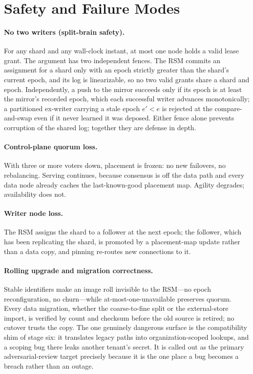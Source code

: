 \documentclass[11pt]{article}
\begin{document}
\section{Safety and Failure Modes}
\label{sec:failure}

\paragraph{No two writers (split-brain safety).}
For any shard and any wall-clock instant, at most one node holds a valid lease
grant. The argument has two independent fences. The RSM commits an assignment
for a shard only with an epoch strictly greater than the shard's current
epoch, and its log is linearizable, so no two valid grants share a shard and
epoch. Independently, a push to the mirror succeeds only if its epoch is at
least the mirror's recorded epoch, which each successful writer advances
monotonically; a partitioned ex-writer carrying a stale epoch $e' < e$ is
rejected at the compare-and-swap even if it never learned it was deposed.
Either fence alone prevents corruption of the shared log; together they are
defense in depth.

\paragraph{Control-plane quorum loss.}
With three or more voters down, placement is frozen: no new failovers, no
rebalancing. Serving continues, because consensus is off the data path and
every data node already caches the last-known-good placement map. Agility
degrades; availability does not.

\paragraph{Writer node loss.}
The RSM assigns the shard to a follower at the next epoch; the follower, which
has been replicating the shard, is promoted by a placement-map update rather
than a data copy, and pinning re-routes new connections to it.

\paragraph{Rolling upgrade and migration correctness.}
Stable identifiers make an image roll invisible to the RSM---no epoch
reconfiguration, no churn---while at-most-one-unavailable preserves quorum.
Every data migration, whether the coarse-to-fine split or the external-store
import, is verified by count and checksum before the old source is retired; no
cutover trusts the copy. The one genuinely dangerous surface is the
compatibility shim of stage six: it translates legacy paths into
organization-scoped lookups, and a scoping bug there leaks another tenant's
secret. It is called out as the primary adversarial-review target precisely
because it is the one place a bug becomes a breach rather than an outage.
\end{document}
